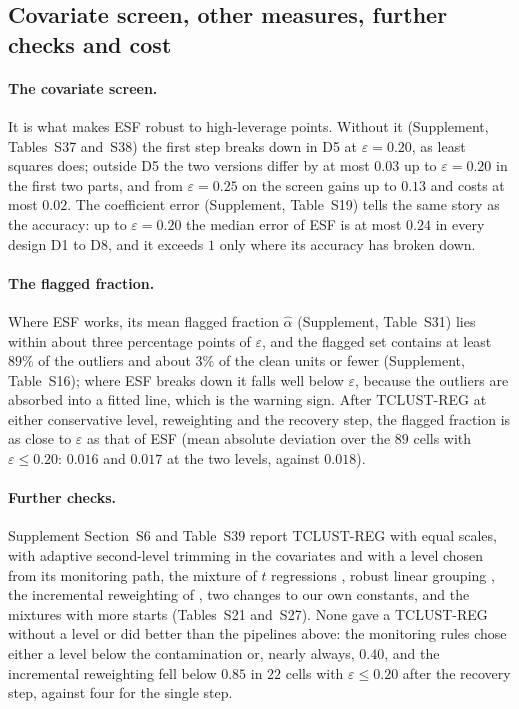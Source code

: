 \subsection{Covariate screen, other measures, further checks and cost}
\label{sec:measures}

\paragraph{The covariate screen.} It is what makes ESF robust to high-leverage points.
Without it (Supplement, Tables~S37 and~S38) the first step breaks down in D5 at
$\varepsilon=0.20$, as least squares does; outside D5 the two versions differ by at most $0.03$ up to
$\varepsilon=0.20$ in the first two parts, and from $\varepsilon=0.25$ on the screen gains up to $0.13$ and costs at
most $0.02$. The coefficient error (Supplement, Table~S19) tells the same story as the
accuracy: up to $\varepsilon=0.20$ the median error of ESF is at most $0.24$ in every design
D1 to D8, and it exceeds $1$ only where its accuracy has broken down.

\paragraph{The flagged fraction.} Where ESF works, its mean flagged fraction $\hat\alpha$
(Supplement, Table~S31) lies within about three percentage points of $\varepsilon$, and the
flagged set contains at least $89\%$ of the outliers and about $3\%$ of the clean units or
fewer (Supplement, Table~S16); where ESF breaks down it falls well below $\varepsilon$, because
the outliers are absorbed into a fitted line, which is the warning sign. After TCLUST-REG at
either conservative level, reweighting and the recovery step, the flagged fraction is as
close to $\varepsilon$ as that of ESF (mean absolute deviation over the $89$ cells with
$\varepsilon\le0.20$: $0.016$ and $0.017$ at the two levels, against $0.018$).

\paragraph{Further checks.} Supplement Section~S6 and Table~S39 report TCLUST-REG with equal
scales, with adaptive second-level trimming in the covariates and with a level chosen from its
monitoring path, the mixture of $t$ regressions \citep{yao2014robust}, robust linear grouping \citep{garciaescudero2009robust}, the incremental
reweighting of \citet{dotto2018reweighting}, two changes to our own constants, and the
mixtures with more starts (Tables~S21 and~S27). None gave a TCLUST-REG without a level or did
better than the pipelines above: the monitoring rules chose either a level below the
contamination or, nearly always, $0.40$, and the incremental reweighting fell below $0.85$ in
$22$ cells with $\varepsilon\le0.20$ after the recovery step, against four for the single
step.

